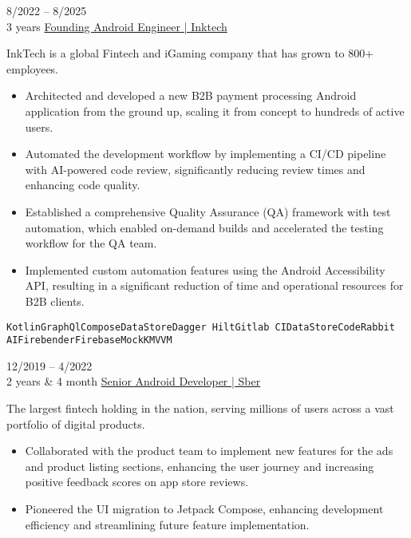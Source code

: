 \documentclass[9pt]{developercv} %
\begin{document}


\begin{entrylist}
	\entry
		{8/2022 -- 8/2025\\\footnotesize{3 years}}
		{\href{https://inktech.org/}{Founding Android Engineer | Inktech}}
		{ }
		{InkTech is a global Fintech and iGaming company that has grown to 800+ employees.
		\begin{itemize}[leftmargin=*, labelsep=5pt]
			\setlength{\itemsep}{1pt}
			\item Architected and developed a new B2B payment processing Android application from the ground up, scaling it from concept to hundreds of active users.
			\item Automated the development workflow by implementing a CI/CD pipeline with AI-powered code review, significantly reducing review times and enhancing code quality.
			\item Established a comprehensive Quality Assurance (QA) framework with test automation, which enabled on-demand builds and accelerated the testing workflow for the QA team.
			\item Implemented custom automation features using the Android Accessibility API, resulting in a significant reduction of time and operational resources for B2B clients.
		\end{itemize}
		\texttt{Kotlin}\slashsep\texttt{GraphQl}\slashsep\texttt{Compose}\slashsep\texttt{DataStore}\slashsep\texttt{Dagger Hilt}\slashsep\texttt{Gitlab CI}\slashsep\texttt{DataStore}\slashsep\texttt{CodeRabbit AI}\slashsep\texttt{Firebender}\slashsep\texttt{Firebase}\slashsep\texttt{MockK}\slashsep\texttt{MVVM}
        }
	\entry
		{12/2019 -- 4/2022\\\footnotesize{2 years \& 4 month}}
		{\href{https://www.sberbank.ru/en/}{Senior Android Developer | Sber}}
		{ }
		{The largest fintech holding in the nation, serving millions of users across a vast portfolio of digital products.
		\begin{itemize}[leftmargin=*, labelsep=5pt]
			\setlength{\itemsep}{1pt}
            \item Collaborated with the product team to implement new features for the ads and product listing sections, enhancing the user journey and increasing positive feedback scores on app store reviews.
			\item Pioneered the UI migration to Jetpack Compose, enhancing development efficiency and streamlining future feature implementation.

\end{itemize}}
\end{entrylist}
\end{document}
